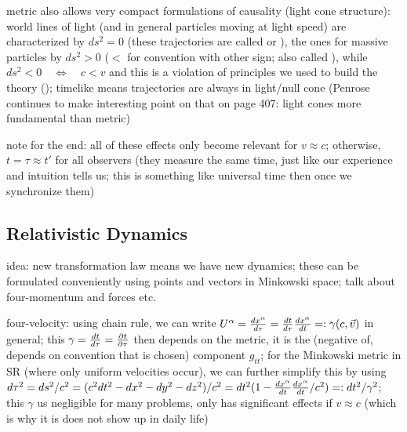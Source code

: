 metric also allows very compact formulations of causality (light cone structure): world lines of light (and in general particles moving at light speed) are characterized by $ds^2 = 0$ (these trajectories are called  or ), the ones for massive particles by $ds^2 > 0$ ($<$ for convention with other sign; also called ), while $ds^2 < 0 \quad \Leftrightarrow \quad c < v$ and this is a violation of principles we used to build the theory (); timelike means trajectories are always in light/null cone (Penrose continues to make interesting point on that on page 407: light cones more fundamental than metric)



note for the end: all of these effects only become relevant for $v \approx c$; otherwise, $t = \tau \approx t'$ for all observers (they measure the same time, just like our experience and intuition tells us; this is something like universal time then once we synchronize them)




		\subsection{Relativistic Dynamics}
idea: new transformation law means we have new dynamics; these can be formulated conveniently using points and vectors in Minkowski space; talk about four-momentum and forces etc.



four-velocity: using chain rule, we can write $U^\alpha = \dv{x^\alpha}{\tau} = \dv{t}{\tau} \dv{x^\alpha}{t} =: \gamma (c, \vec{v})$ in general; this $\gamma = \dv{t}{\tau} = \pdv{t}{\tau}$ then depends on the metric, it is the (negative of, depends on convention that is chosen) component $g_{tt}$; for the Minkowski metric in SR (where only uniform velocities occur), we can further simplify this by using $d\tau^2 = ds^2 / c^2 = (c^2 dt^2 - dx^2 - dy^2 - dz^2) / c^2 = dt^2 (1 - \dv{x^\alpha}{t} \dv{x^\alpha}{t} / c^2) =: dt^2 / \gamma^2$; this $\gamma$ us negligible for many problems, only has significant effects if $v \approx c$ (which is why it is does not show up in daily life)



\newpage



